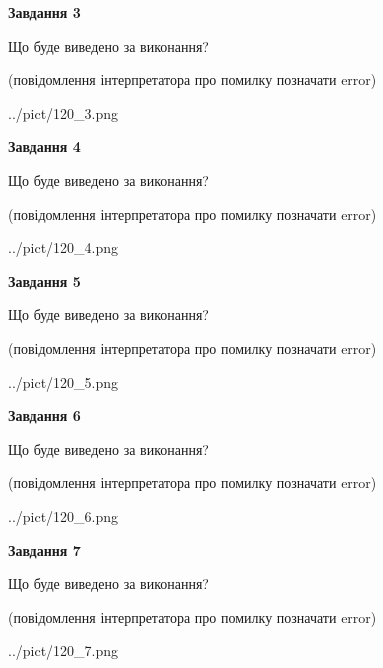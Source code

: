 \documentclass[12pt, ukrainian]{article}
\begin{document}
{\begin {large}
{\begin {center}\textbf{Завдання 3}\end {center}}\par
Що буде виведено за виконання?\par
 (повідомлення інтерпретатора про помилку позначати error)\par
\begin{center}
	{../pict/120_3.png}
\end{center}
\newpage

{\begin {center}\textbf{Завдання 4}\end {center}}\par
Що буде виведено за виконання?\par
 (повідомлення інтерпретатора про помилку позначати error)\par
\begin{center}
	{../pict/120_4.png}
\end{center}
\newpage

{\begin {center}\textbf{Завдання 5}\end {center}}\par
Що буде виведено за виконання?\par
 (повідомлення інтерпретатора про помилку позначати error)\par
\begin{center}
	{../pict/120_5.png}
\end{center}
\newpage

{\begin {center}\textbf{Завдання 6}\end {center}}\par
Що буде виведено за виконання?\par
 (повідомлення інтерпретатора про помилку позначати error)\par
\begin{center}
	{../pict/120_6.png}
\end{center}
\newpage

{\begin {center}\textbf{Завдання 7}\end {center}}\par
Що буде виведено за виконання?\par
 (повідомлення інтерпретатора про помилку позначати error)\par
\begin{center}
	{../pict/120_7.png}
\end{center}
\newpage


\end{large}}
\end{document}
